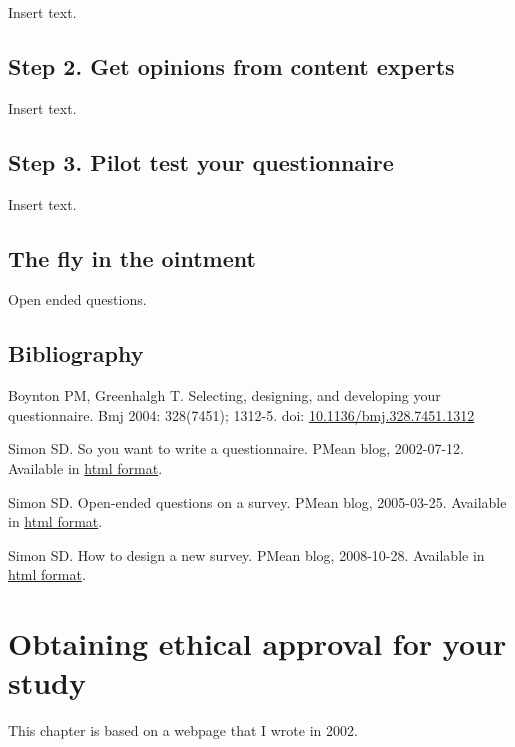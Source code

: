 \documentclass[
  letterpaper,
  DIV=11,
  numbers=noendperiod]{scrreprt}
\begin{document}
Insert text.

\section{Step 2. Get opinions from content
experts}\label{step-2.-get-opinions-from-content-experts}

Insert text.

\section{Step 3. Pilot test your
questionnaire}\label{step-3.-pilot-test-your-questionnaire}

Insert text.

\section{The fly in the ointment}\label{the-fly-in-the-ointment-3}

Open ended questions.

\section{Bibliography}\label{bibliography-6}

Boynton PM, Greenhalgh T. Selecting, designing, and developing your
questionnaire. Bmj 2004: 328(7451); 1312-5. doi:
\href{https://doi.org/10.1136/bmj.328.7451.1312}{10.1136/bmj.328.7451.1312}

Simon SD. So you want to write a questionnaire. PMean blog, 2002-07-12.
Available in
\href{http://pmean.com/posts/steps-in-writing-questionnaire/}{html
format}.

Simon SD. Open-ended questions on a survey. PMean blog, 2005-03-25.
Available in \href{http://pmean.com/posts/open-ended-questions/}{html
format}.

Simon SD. How to design a new survey. PMean blog, 2008-10-28. Available
in \href{http://pmean.com/posts/plan-survey/}{html format}.


\chapter{Obtaining ethical approval for your
study}\label{obtaining-ethical-approval-for-your-study}

This chapter is based on a webpage that I wrote in 2002.
\end{document}
